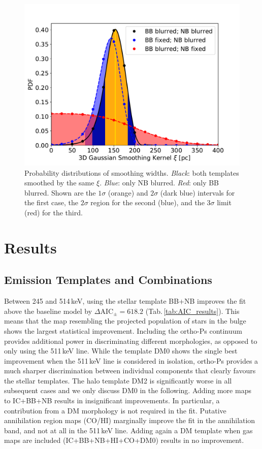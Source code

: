 \documentclass[doublespace,nopageskip]{VTthesis} %
\begin{document}
	
	\begin{figure}%
		\centering
		\includegraphics[width=0.8\columnwidth,trim=0.0in 0.15in 0.4in 0.7in, clip=True]{Figures/511keV/Blurred_bulges3D_PDF_comparison.pdf}
		\caption{Probability distributions of smoothing widths. \textit{Black}: both templates smoothed by the same $\xi$. \textit{Blue}: only NB blurred. \textit{Red}: only BB blurred. Shown are the $1\sigma$ (orange) and $2\sigma$ (dark blue) intervals for the first case, the $2\sigma$ region for the second (blue), and the $3\sigma$ limit (red) for the third.} 
		\label{fig:blur}
	\end{figure}
	
	
	\section{Results}\label{sec:results}
	\subsection{Emission Templates and Combinations}\label{sec:maps_as_they_are}
	Between 245 and 514\,keV, using the stellar template BB+NB improves the fit above the baseline model by $\Delta\mathrm{AIC}_{\pm} = 618.2$ (Tab.\,\ref{tab:AIC_results}). 
	This means that the map resembling the projected population of stars in the bulge shows the largest statistical improvement.
	Including the ortho-Ps continuum provides additional power in discriminating different morphologies, as opposed to only using the 511\,keV line.
	While the template DM0 shows the single best improvement when the 511\,keV line is considered in isolation, ortho-Ps provides a much sharper discrimination between individual components that clearly favours the stellar templates.
	The halo template DM2 is significantly worse in all subsequent cases and we only discuss DM0 in the following.
	Adding more maps to IC+BB+NB results in insignificant improvements.
	In particular, a contribution from a DM morphology is not required in the fit.
	Putative annihilation region maps (CO/HI) marginally improve the fit in the annihilation band, and not at all in the 511\,keV line.
	Adding again a DM template when gas maps are included (IC+BB+NB+HI+CO+DM0) results in no improvement.
	
\end{document}
